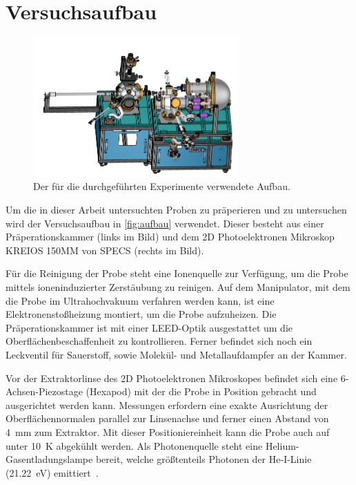     \section{Versuchsaufbau}
    \label{sec:Versuchsaufbau}
        \begin{figure}
            \centering
            \includegraphics[width=0.7\textwidth]{MM.png}
            \caption{Der für die durchgeführten Experimente verwendete Aufbau.}
            \label{fig:aufbau}
        \end{figure}
        Um die in dieser Arbeit untersuchten Proben zu präperieren und zu untersuchen wird der Versuchsaufbau in \autoref{fig:aufbau} verwendet.
        Dieser besteht aus einer Präperationskammer (links im Bild) und dem 2D Photoelektronen Mikroskop KREIOS 150MM von SPECS (rechts im Bild).

        Für die Reinigung der Probe steht eine Ionenquelle zur Verfügung, um die Probe mittels ioneninduzierter Zerstäubung zu reinigen.
        Auf dem Manipulator, mit dem die Probe im Ultrahochvakuum verfahren werden kann, ist eine Elektronenstoßheizung montiert, um die Probe aufzuheizen.
        Die Präperationskammer ist mit einer LEED-Optik ausgestattet um die Oberflächenbeschaffenheit zu kontrollieren.
        Ferner befindet sich noch ein Leckventil für Sauerstoff, sowie Molekül- und Metallaufdampfer an der Kammer.
        
        Vor der Extraktorlinse des 2D Photoelektronen Mikroskopes befindet sich eine 6-Achsen-Piezostage (Hexapod) mit der die Probe in Position gebracht und ausgerichtet werden kann.
        Messungen erfordern eine exakte Ausrichtung der Oberflächennormalen parallel zur Linsenachse und ferner einen Abstand von \SI{4}{\milli\meter} zum Extraktor.
        Mit dieser Positioniereinheit kann die Probe auch auf unter \SI{10}{\kelvin} abgekühlt werden.
        Als Photonenquelle steht eine Helium-Gasentladungslampe bereit, welche größtenteils Photonen der He-I-Linie (\SI{21.22}{\electronvolt}) emittiert~\cite{UVS}.